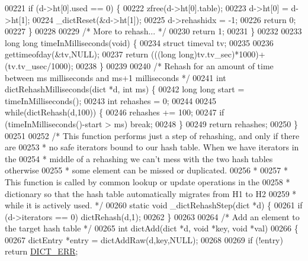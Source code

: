 \begin{DoxyCode}
00221     \textcolor{keywordflow}{if} (d->ht[0].used == 0) \{
00222         zfree(d->ht[0].table);
00223         d->ht[0] = d->ht[1];
00224         \_dictReset(&d->ht[1]);
00225         d->rehashidx = -1;
00226         \textcolor{keywordflow}{return} 0;
00227     \}
00228 
00229     \textcolor{comment}{/* More to rehash... */}
00230     \textcolor{keywordflow}{return} 1;
00231 \}
00232 
00233 \textcolor{keywordtype}{long} \textcolor{keywordtype}{long} timeInMilliseconds(\textcolor{keywordtype}{void}) \{
00234     \textcolor{keyword}{struct} timeval tv;
00235 
00236     gettimeofday(&tv,NULL);
00237     \textcolor{keywordflow}{return} (((\textcolor{keywordtype}{long} \textcolor{keywordtype}{long})tv.tv\_sec)*1000)+(tv.tv\_usec/1000);
00238 \}
00239 
00240 \textcolor{comment}{/* Rehash for an amount of time between ms milliseconds and ms+1 milliseconds */}
00241 \textcolor{keywordtype}{int} dictRehashMilliseconds(dict *d, \textcolor{keywordtype}{int} ms) \{
00242     \textcolor{keywordtype}{long} \textcolor{keywordtype}{long} start = timeInMilliseconds();
00243     \textcolor{keywordtype}{int} rehashes = 0;
00244 
00245     \textcolor{keywordflow}{while}(dictRehash(d,100)) \{
00246         rehashes += 100;
00247         \textcolor{keywordflow}{if} (timeInMilliseconds()-start > ms) \textcolor{keywordflow}{break};
00248     \}
00249     \textcolor{keywordflow}{return} rehashes;
00250 \}
00251 
00252 \textcolor{comment}{/* This function performs just a step of rehashing, and only if there are}
00253 \textcolor{comment}{ * no safe iterators bound to our hash table. When we have iterators in the}
00254 \textcolor{comment}{ * middle of a rehashing we can't mess with the two hash tables otherwise}
00255 \textcolor{comment}{ * some element can be missed or duplicated.}
00256 \textcolor{comment}{ *}
00257 \textcolor{comment}{ * This function is called by common lookup or update operations in the}
00258 \textcolor{comment}{ * dictionary so that the hash table automatically migrates from H1 to H2}
00259 \textcolor{comment}{ * while it is actively used. */}
00260 \textcolor{keyword}{static} \textcolor{keywordtype}{void} \_dictRehashStep(dict *d) \{
00261     \textcolor{keywordflow}{if} (d->iterators == 0) dictRehash(d,1);
00262 \}
00263 
00264 \textcolor{comment}{/* Add an element to the target hash table */}
00265 \textcolor{keywordtype}{int} dictAdd(dict *d, \textcolor{keywordtype}{void} *key, \textcolor{keywordtype}{void} *val)
00266 \{
00267     dictEntry *entry = dictAddRaw(d,key,NULL);
00268 
00269     \textcolor{keywordflow}{if} (!entry) \textcolor{keywordflow}{return} \hyperlink{dict_8h_a6ce31f31f044b1570d335e8fa0c388c6}{DICT\_ERR};

\end{DoxyCode}
